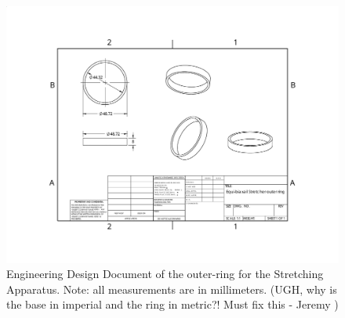 \begin{figure}[h!]
	
	
	\centerline{\includegraphics[scale=.85]{Chapters/Figures/Stretcher_outer.pdf}}
	\vspace{-.7em}
	\caption[Stretcher outer-ring]{Engineering Design Document of the outer-ring for the Stretching Apparatus. Note: all measurements are in millimeters. (UGH, why is the base in imperial and the ring in metric?! Must fix this - Jeremy )}
	
	\label{fig:stretcherDesignRing}
\end{figure}

